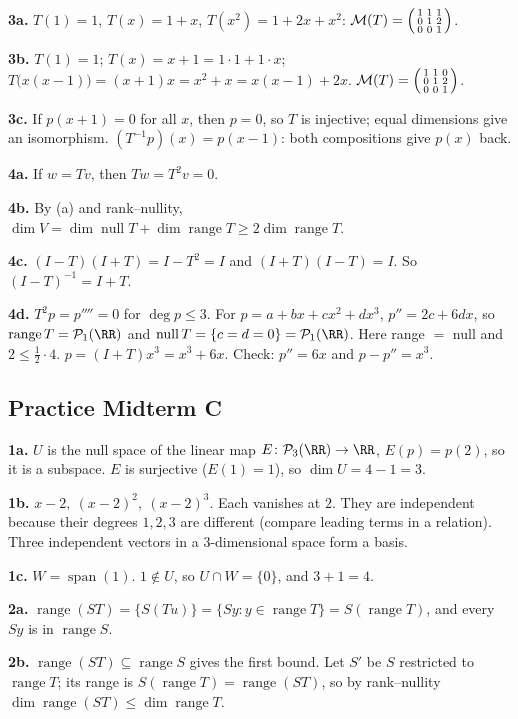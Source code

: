 \documentclass[11pt]{scrartcl}
\DeclareMathOperator{\nul}{null}
\DeclareMathOperator{\range}{range}
\DeclareMathOperator{\spn}{span}
\newcommand{\PP}{\mathcal P}
\newcommand{\MM}{\mathcal M}
\begin{document}
\textbf{3a.} $T(1)=1$, $T(x)=1+x$, $T(x^2)=1+2x+x^2$:
$\MM(T)=\begin{psmallmatrix}1&1&1\\0&1&2\\0&0&1\end{psmallmatrix}$.

\textbf{3b.} $T(1)=1$; $T(x)=x+1=1\cdot1+1\cdot x$; $T\big(x(x-1)\big)=(x+1)x=x^2+x=x(x-1)+2x$.
$\MM(T)=\begin{psmallmatrix}1&1&0\\0&1&2\\0&0&1\end{psmallmatrix}$.

\textbf{3c.} If $p(x+1)=0$ for all $x$, then $p=0$, so $T$ is injective; equal dimensions give an isomorphism. $(T^{-1}p)(x)=p(x-1)$: both compositions give $p(x)$ back.

\textbf{4a.} If $w=Tv$, then $Tw=T^2v=0$.

\textbf{4b.} By (a) and rank--nullity, $\dim V=\dim\nul T+\dim\range T\ge2\dim\range T$.

\textbf{4c.} $(I-T)(I+T)=I-T^2=I$ and $(I+T)(I-T)=I$. So $(I-T)^{-1}=I+T$.

\textbf{4d.} $T^2p=p''''=0$ for $\deg p\le3$. For $p=a+bx+cx^2+dx^3$, $p''=2c+6dx$, so $\range T=\PP_1(\RR)$ and $\nul T=\{c=d=0\}=\PP_1(\RR)$. Here range $=$ null and $2\le\tfrac12\cdot4$.
$p=(I+T)x^3=x^3+6x$. Check: $p''=6x$ and $p-p''=x^3$.

\subsection*{Practice Midterm C}
\textbf{1a.} $U$ is the null space of the linear map $E\colon\PP_3(\RR)\to\RR$, $E(p)=p(2)$, so it is a subspace. $E$ is surjective ($E(1)=1$), so $\dim U=4-1=3$.

\textbf{1b.} $x-2,\ (x-2)^2,\ (x-2)^3$. Each vanishes at $2$. They are independent because their degrees $1,2,3$ are different (compare leading terms in a relation). Three independent vectors in a $3$-dimensional space form a basis.

\textbf{1c.} $W=\spn(1)$. $1\notin U$, so $U\cap W=\{0\}$, and $3+1=4$.

\textbf{2a.} $\range(ST)=\{S(Tu)\}=\{Sy:y\in\range T\}=S(\range T)$, and every $Sy$ is in $\range S$.

\textbf{2b.} $\range(ST)\subseteq\range S$ gives the first bound. Let $S'$ be $S$ restricted to $\range T$; its range is $S(\range T)=\range(ST)$, so by rank--nullity $\dim\range(ST)\le\dim\range T$.
\end{document}
